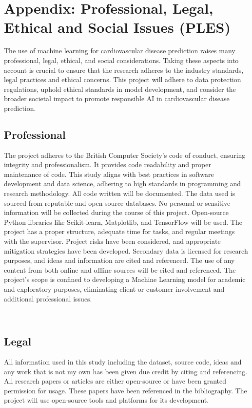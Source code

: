 \section{Appendix: Professional, Legal, Ethical and
Social Issues (PLES)}
\label{app:uml}
The use of machine learning for cardiovascular disease prediction raises many professional, legal, ethical, and social considerations. Taking these aspects into account is crucial to ensure that the research adheres to the industry standards, legal practices and ethical concerns. This project will adhere to data protection regulations, uphold ethical standards in model development, and consider the broader societal impact to promote responsible AI in cardiovascular disease prediction. \\
\subsection{Professional}
The project adheres to the British Computer Society's code of conduct, ensuring integrity and professionalism. It provides code readability and proper maintenance of code. This study aligns with best practices in software development and data science, adhering to high standards in programming and research methodology. All code written will be documented. The data used is sourced from reputable and open-source databases. No personal or sensitive information will be collected during the course of this project. Open-source Python libraries like Scikit-learn, Matplotlib, and TensorFlow will be used. The project has a proper structure, adequate time for tasks, and regular meetings with the supervisor. Project risks have been considered, and appropriate mitigation strategies have been developed. Secondary data is licensed for research purposes, and ideas and information are cited and referenced. The use of any content from both online and offline sources will be cited and referenced. The project's scope is confined to developing a Machine Learning model for academic and exploratory purposes, eliminating client or customer involvement and additional professional issues.

\\
\subsection{Legal}
All information used in this study including the dataset, source code, ideas and any work that is not my own has been given due credit by citing and referencing. All research papers or articles are either open-source or have been granted permission for usage. These papers have been referenced in the bibliography. The project will use open-source tools and platforms for its development.

